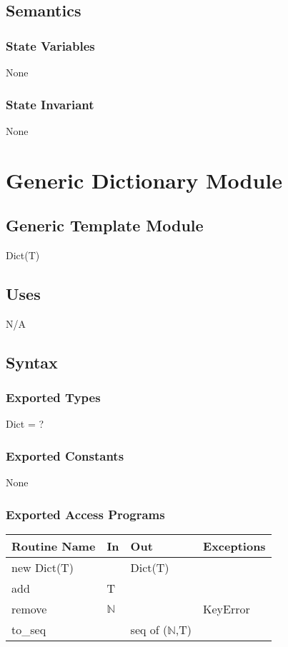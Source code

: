 \documentclass[12pt, titlepage]{article}
\begin{document}
\subsection*{Semantics}
\subsubsection* {State Variables}
None

\subsubsection* {State Invariant}
None

\newpage

\section*{Generic Dictionary Module}

\subsection*{Generic Template Module}
Dict(T)

\subsection*{Uses}
N/A

\subsection*{Syntax}
\subsubsection*{Exported Types}
Dict = ?

\subsubsection*{Exported Constants}
None

\subsubsection* {Exported Access Programs}
\begin{tabular}{|p{3cm}|p{3cm}|p{3cm}|p{4.5cm}|}
    \hline
    \textbf{Routine Name} & \textbf{In} & \textbf{Out} & \textbf{Exceptions} \\
    \hline
    new Dict(T) & & Dict(T) &\\
    \hline
    add & T & &\\
    \hline
    remove & $\mathbb{N}$ & & KeyError\\
    \hline
    to\_seq & & seq of ($\mathbb{N}$,T) & \\
    \hline
\end{tabular}
\end{document}
